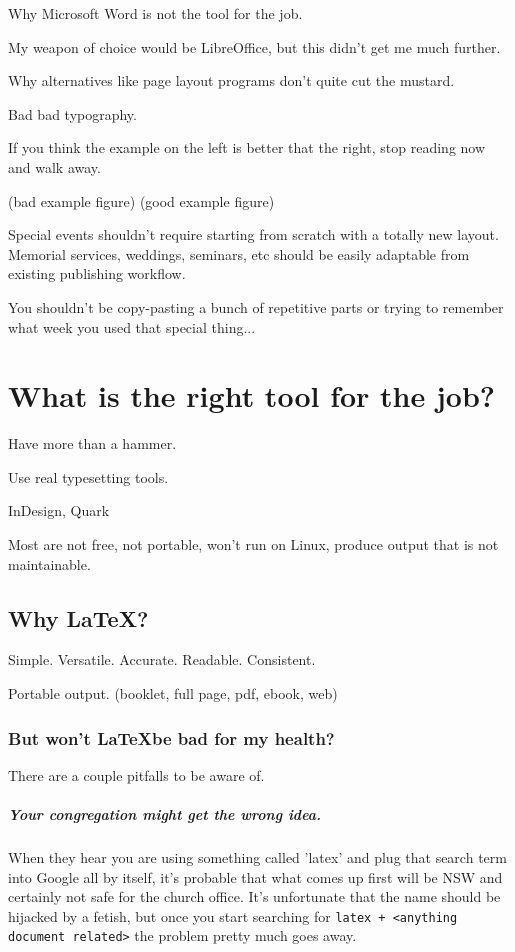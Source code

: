\documentclass[12pt]{scrartcl}
\begin{document}
Why Microsoft Word is not the tool for the job.

My weapon of choice would be LibreOffice, but this didn't get me much further.

Why alternatives like page layout programs don't quite cut the mustard.

Bad bad typography.

If you think the example on the left is better that the right, stop reading now
and walk away.

(bad example figure) (good example figure)

Special events shouldn't require starting from scratch with a totally new
layout. Memorial services, weddings, seminars, etc should be easily adaptable
from existing publishing workflow.

You shouldn't be copy-pasting a bunch of repetitive parts or trying to remember
what week you used that special thing...

\section{What is the right tool for the job?}

Have more than a hammer.

Use real typesetting tools.

InDesign, Quark

Most are not free, not portable, won't run on Linux, produce output that is not
maintainable.

\subsection{Why \LaTeX?}

Simple. Versatile. Accurate. Readable. Consistent.

Portable output. (booklet, full page, pdf, ebook, web)

\subsubsection{But won't \LaTeX be bad for my health?}

There are a couple pitfalls to be aware of.

\subparagraph{Your congregation might get the wrong idea.}

When they hear you are using something called 'latex' and plug that search term
into Google all by itself, it's probable that what comes up first will be NSW
and certainly not safe for the church office. It's unfortunate that the name
should be hijacked by a fetish, but once you start searching for \texttt{latex +
	<anything document related>} the problem pretty much goes away.
\end{document}
